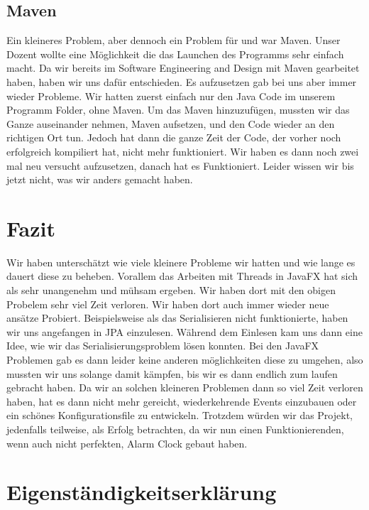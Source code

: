 \documentclass[11pt,titelpage]{scrartcl}
\begin{document}
\subsection{Maven}
Ein kleineres Problem, aber dennoch ein Problem für und war Maven. Unser Dozent wollte eine Möglichkeit die das Launchen des Programms sehr einfach macht. Da wir bereits im Software Engineering and Design mit Maven gearbeitet
haben, haben wir uns dafür entschieden. Es aufzusetzen gab bei uns aber immer wieder Probleme. Wir hatten zuerst einfach nur den Java Code im unserem Programm Folder, ohne Maven. Um das Maven hinzuzufügen, mussten wir das Ganze
auseinander nehmen, Maven aufsetzen, und den Code wieder an den richtigen Ort tun. Jedoch hat dann die ganze Zeit der Code, der vorher noch erfolgreich kompiliert hat, nicht mehr funktioniert. Wir haben es dann noch zwei mal neu
versucht aufzusetzen, danach hat es Funktioniert. Leider wissen wir bis jetzt nicht, was wir anders gemacht haben.

\section{Fazit}
Wir haben unterschätzt wie viele kleinere Probleme wir hatten und wie lange es dauert diese zu beheben. Vorallem das Arbeiten mit Threads in JavaFX hat sich als sehr
unangenehm und mühsam ergeben. Wir haben dort mit den obigen Probelem sehr viel Zeit verloren. Wir haben dort auch immer wieder neue ansätze Probiert. Beispielsweise als das
Serialisieren nicht funktionierte, haben wir uns angefangen in JPA einzulesen. Während dem Einlesen kam uns dann eine Idee, wie wir das Serialisierungsproblem lösen konnten.
Bei den JavaFX Problemen gab es dann leider keine anderen möglichkeiten diese zu umgehen, also mussten wir uns solange damit kämpfen, bis wir es dann endlich zum laufen
gebracht haben.
Da wir an solchen kleineren Problemen dann so viel Zeit verloren haben, hat es dann nicht mehr gereicht, wiederkehrende Events einzubauen oder ein schönes Konfigurationsfile
zu entwickeln.
Trotzdem würden wir das Projekt, jedenfalls teilweise, als Erfolg betrachten, da wir nun einen Funktionierenden, wenn auch nicht perfekten, Alarm Clock gebaut haben.

\section{Eigenständigkeitserklärung}


\end{document}
